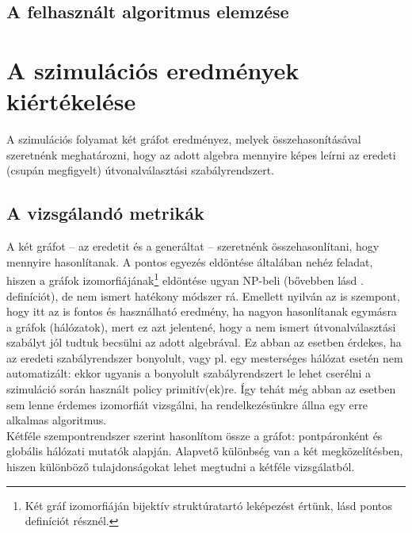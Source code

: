     \subsection{A felhasznált algoritmus elemzése}

                \todo

  \section{A szimulációs eredmények kiértékelése}
  A szimulációs folyamat két gráfot eredményez, melyek összehasonításával szeretnénk meghatározni, hogy az adott algebra mennyire képes leírni az eredeti (csupán megfigyelt) útvonalválasztási szabályrendszert.

    \subsection{A vizsgálandó metrikák}\label{metrikak}
    A két gráfot -- az eredetit és a generáltat -- szeretnénk összehasonlítani, hogy mennyire hasonlítanak. A pontos egyezés eldöntése általában nehéz feladat, hiszen a gráfok izomorfiájának\footnote{Két gráf izomorfiáján bijektív struktúratartó leképezést értünk, lásd pontos definíciót  résznél.} eldöntése ugyan NP-beli (bővebben lásd . definíciót), de nem ismert hatékony módszer rá. Emellett nyilván az is szempont, hogy itt az is fontos és használható eredmény, ha nagyon hasonlítanak egymásra a gráfok (hálózatok), mert ez azt jelentené, hogy a nem ismert útvonalválasztási szabályt jól tudtuk becsülni az adott algebrával. Ez abban az esetben érdekes, ha az eredeti szabályrendszer bonyolult, vagy pl. egy mesterséges hálózat esetén nem automatizált: ekkor ugyanis a bonyolult szabályrendszert le lehet cserélni a szimuláció során használt policy primitív(ek)re. Így tehát még abban az esetben sem lenne érdemes izomorfiát vizsgálni, ha rendelkezésünkre állna egy erre alkalmas algoritmus.\\

    Kétféle szempontrendszer szerint hasonlítom össze a gráfot: pontpáronként és globális hálózati mutatók alapján. Alapvető különbség van a két megközelítésben, hiszen különböző tulajdonságokat lehet megtudni a kétféle vizsgálatból.\\

